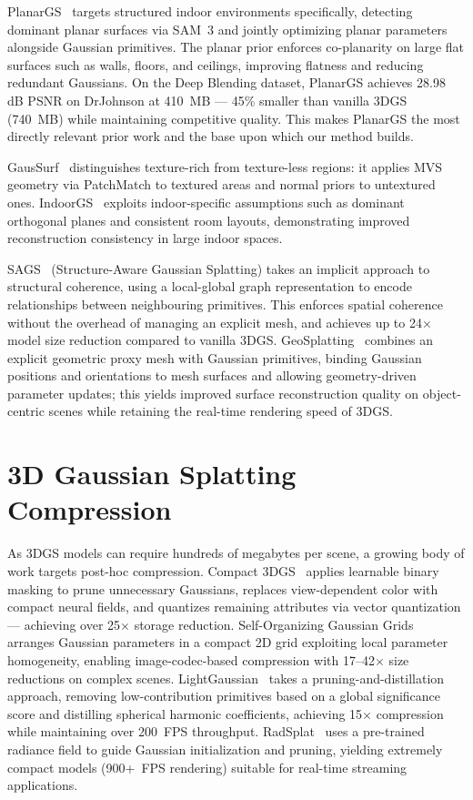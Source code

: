 PlanarGS~\cite{planargs} targets structured indoor environments specifically, detecting dominant planar surfaces via SAM~3 and jointly optimizing planar parameters alongside Gaussian primitives. The planar prior enforces co-planarity on large flat surfaces such as walls, floors, and ceilings, improving flatness and reducing redundant Gaussians. On the Deep Blending dataset, PlanarGS achieves 28.98 dB PSNR on DrJohnson at 410~MB — 45\% smaller than vanilla 3DGS (740~MB) while maintaining competitive quality. This makes PlanarGS the most directly relevant prior work and the base upon which our method builds.

GausSurf~\cite{gcaussurf} distinguishes texture-rich from texture-less regions: it applies MVS geometry via PatchMatch to textured areas and normal priors to untextured ones. IndoorGS~\cite{indoorgs} exploits indoor-specific assumptions such as dominant orthogonal planes and consistent room layouts, demonstrating improved reconstruction consistency in large indoor spaces.

SAGS~\cite{sags} (Structure-Aware Gaussian Splatting) takes an implicit approach to structural coherence, using a local-global graph representation to encode relationships between neighbouring primitives. This enforces spatial coherence without the overhead of managing an explicit mesh, and achieves up to 24$\times$ model size reduction compared to vanilla 3DGS. GeoSplatting~\cite{geosplatting} combines an explicit geometric proxy mesh with Gaussian primitives, binding Gaussian positions and orientations to mesh surfaces and allowing geometry-driven parameter updates; this yields improved surface reconstruction quality on object-centric scenes while retaining the real-time rendering speed of 3DGS.

\section{3D Gaussian Splatting Compression}

As 3DGS models can require hundreds of megabytes per scene, a growing body of work targets post-hoc compression. Compact 3DGS~\cite{compact3dgs} applies learnable binary masking to prune unnecessary Gaussians, replaces view-dependent color with compact neural fields, and quantizes remaining attributes via vector quantization — achieving over 25$\times$ storage reduction. Self-Organizing Gaussian Grids~\cite{selforganizinggs} arranges Gaussian parameters in a compact 2D grid exploiting local parameter homogeneity, enabling image-codec-based compression with 17--42$\times$ size reductions on complex scenes. LightGaussian~\cite{lightgaussian} takes a pruning-and-distillation approach, removing low-contribution primitives based on a global significance score and distilling spherical harmonic coefficients, achieving 15$\times$ compression while maintaining over 200~FPS throughput. RadSplat~\cite{radsplat} uses a pre-trained radiance field to guide Gaussian initialization and pruning, yielding extremely compact models (900+~FPS rendering) suitable for real-time streaming applications.

